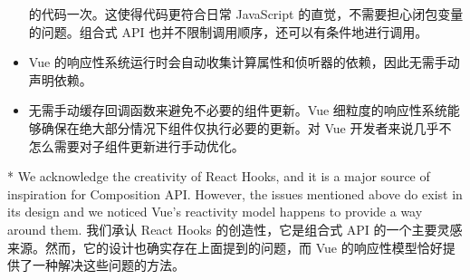 \begin{paracol}{2}
\begin{itemize}
  的代码一次。这使得代码更符合日常 JavaScript
  的直觉，不需要担心闭包变量的问题。组合式 API
  也并不限制调用顺序，还可以有条件地进行调用。
\item
  Vue
  的响应性系统运行时会自动收集计算属性和侦听器的依赖，因此无需手动声明依赖。
\item
  无需手动缓存回调函数来避免不必要的组件更新。Vue
  细粒度的响应性系统能够确保在绝大部分情况下组件仅执行必要的更新。对 Vue
  开发者来说几乎不怎么需要对子组件更新进行手动优化。
\end{itemize}
\switchcolumn[0]*%
We acknowledge the creativity of React Hooks, and it is a major source
of inspiration for Composition API. However, the issues mentioned above
do exist in its design and we noticed Vue's reactivity model happens to
provide a way around them.
\switchcolumn
我们承认 React Hooks 的创造性，它是组合式 API
的一个主要灵感来源。然而，它的设计也确实存在上面提到的问题，而 Vue
的响应性模型恰好提供了一种解决这些问题的方法。
\end{paracol}


\begin{paracol}{2} 

\end{paracol}



\begin{paracol}{2} 

\end{paracol}



\begin{paracol}{2} 

\end{paracol}


\begin{paracol}{2} 

\end{paracol}



\begin{paracol}{2} 

\end{paracol}



\begin{paracol}{2} 

\end{paracol}



\begin{paracol}{2} 

\end{paracol}



